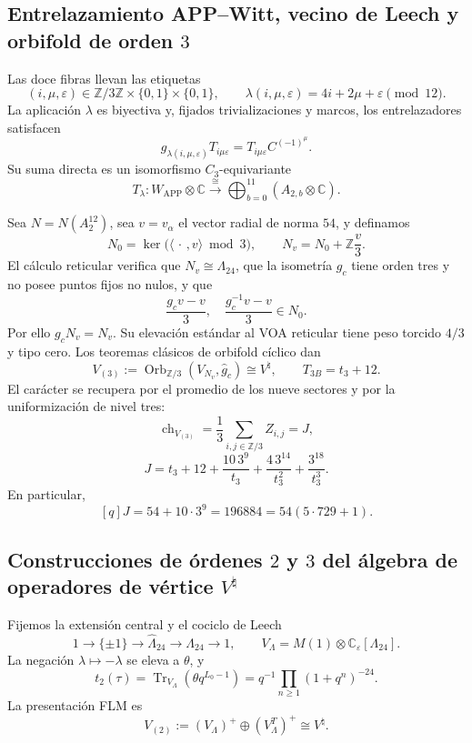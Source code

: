 \subsection{Entrelazamiento APP--Witt, vecino de Leech y orbifold de orden \(3\)}

Las doce fibras llevan las etiquetas
\[
 (i,\mu,\varepsilon)\in
 \mathbb Z/3\mathbb Z\times\{0,1\}\times\{0,1\},
 \qquad
 \lambda(i,\mu,\varepsilon)=4i+2\mu+\varepsilon\pmod{12}.
\]
La aplicación \(\lambda\) es biyectiva y, fijados trivializaciones y marcos,
los entrelazadores satisfacen
\[
 g_{\lambda(i,\mu,\varepsilon)}T_{i\mu\varepsilon}
 =T_{i\mu\varepsilon}C^{(-1)^\mu}.
\]
Su suma directa es un isomorfismo \(C_3\)-equivariante
\[
 T_\lambda:W_{\mathrm{APP}}\otimes\mathbb C
 \xrightarrow{\ \cong\ }
 \bigoplus_{b=0}^{11}(A_{2,b}\otimes\mathbb C).
\]

Sea \(N=N(A_2^{12})\), sea \(v=v_\alpha\) el vector radial de norma \(54\),
y definamos
\[
 N_0=\ker\bigl(\langle\,\cdot\,,v\rangle\bmod3\bigr),
 \qquad N_v=N_0+\mathbb Z\frac v3.
\]
El cálculo reticular verifica que \(N_v\cong\Lambda_{24}\), que la
isometría \(g_c\) tiene orden tres y no posee puntos fijos no nulos, y que
\[
 \frac{g_cv-v}{3},\quad\frac{g_c^{-1}v-v}{3}\in N_0.
\]
Por ello \(g_cN_v=N_v\). Su elevación estándar al VOA reticular tiene peso
torcido \(4/3\) y tipo cero. Los teoremas clásicos de orbifold cíclico dan
\[
 V_{(3)}:=\operatorname{Orb}_{\mathbb Z/3}
       (V_{N_v},\widehat g_c)\cong V^\natural,
 \qquad T_{3B}=t_3+12.
\]
El carácter se recupera por el promedio de los nueve sectores y por la
uniformización de nivel tres:
\[
 \operatorname{ch}_{V_{(3)}}
 =\frac13\sum_{i,j\in\mathbb Z/3}Z_{i,j}=J,
\]
\[
 J=t_3+12+\frac{10\,3^9}{t_3}
       +\frac{4\,3^{14}}{t_3^2}+\frac{3^{18}}{t_3^3}.
\]
En particular,
\[
 [q]J=54+10\cdot3^9=196884=54(5\cdot729+1).
\]

\subsection{Construcciones de órdenes \(2\) y \(3\) del álgebra de operadores de vértice \texorpdfstring{\(V^\natural\)}{V natural}}

Fijemos la extensión central y el cociclo de Leech
\[
 1\longrightarrow\{\pm1\}\longrightarrow\widehat\Lambda_{24}
 \longrightarrow\Lambda_{24}\longrightarrow1,
 \qquad
 V_\Lambda=M(1)\otimes\mathbb C_\varepsilon[\Lambda_{24}].
\]
La negación \(\lambda\mapsto-\lambda\) se eleva a \(\theta\), y
\[
 t_2(\tau)=\operatorname{Tr}_{V_\Lambda}
  \left(\theta q^{L_0-1}\right)
 =q^{-1}\prod_{n\ge1}(1+q^n)^{-24}.
\]
La presentación FLM es
\[
 V_{(2)}:=(V_\Lambda)^+\oplus(V_\Lambda^T)^+\cong V^\natural.
\]

